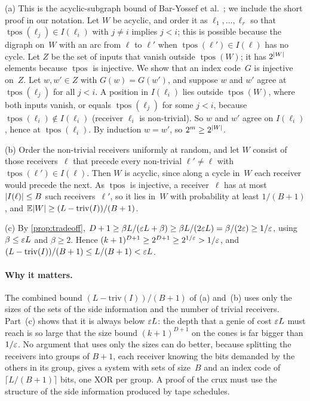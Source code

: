 \begin{informalproof}
(a) This is the acyclic-subgraph bound of Bar-Yossef et al.~\cite[Theorem~3]{BBJK2011}; we include the short proof in
our notation. Let $W$ be acyclic, and order it as
$\ell_1,\dots,\ell_r$ so that $\operatorname{tpos}(\ell_j)\in I(\ell_i)$ with $j\ne i$ implies $j<i$; this is
possible because the digraph on~$W$ with an arc from $\ell$ to $\ell'$ when $\operatorname{tpos}(\ell')\in I(\ell)$
has no cycle. Let $Z$ be the set of inputs that vanish outside $\operatorname{tpos}(W)$; it has $2^{\lvert W \rvert}$
elements because $\operatorname{tpos}$ is injective. We show that an index code~$G$ is injective on~$Z$. Let
$w,w'\in Z$ with $G(w)=G(w')$, and suppose $w$ and $w'$ agree at $\operatorname{tpos}(\ell_j)$ for all $j<i$. A
position in $I(\ell_i)$ lies outside $\operatorname{tpos}(W)$, where both inputs vanish, or equals
$\operatorname{tpos}(\ell_j)$ for some $j<i$, because $\operatorname{tpos}(\ell_i)\notin I(\ell_i)$ (receiver
$\ell_i$ is non-trivial). So $w$ and $w'$ agree on $I(\ell_i)$, hence at $\operatorname{tpos}(\ell_i)$. By induction
$w=w'$, so $2^m\ge2^{\lvert W \rvert}$.

(b) Order the non-trivial receivers uniformly at random, and let $W$ consist of those receivers~$\ell$ that precede
every non-trivial $\ell'\ne\ell$ with $\operatorname{tpos}(\ell')\in I(\ell)$. Then $W$ is acyclic, since along a
cycle in~$W$ each receiver would precede the next. As $\operatorname{tpos}$ is injective, a receiver~$\ell$ has at
most $\lvert I(\ell) \rvert\le B$ such receivers~$\ell'$, so it lies in~$W$ with probability at least $1/(B+1)$, and
$\mathbb E\lvert W \rvert\ge(L-\mathrm{triv}(I))/(B+1)$.

(c) By \cref{prop:tradeoff}, $D+1\ge\beta L/(\varepsilon L+\beta)\ge\beta L/(2\varepsilon L)=\beta/(2\varepsilon)\ge1/\varepsilon$, using
$\beta\le\varepsilon L$ and $\beta\ge2$. Hence $(k+1)^{D+1}\ge2^{D+1}\ge2^{1/\varepsilon}>1/\varepsilon$, and
$(L-\mathrm{triv}(I))/(B+1)\le L/(B+1)<\varepsilon L$.
\end{informalproof}

\paragraph{Why it matters.} The combined bound $(L-\mathrm{triv}(I))/(B+1)$ of (a) and~(b) uses only the sizes of the
sets of the side information and the number of trivial receivers. Part~(c) shows that it is always below $\varepsilon L$: the
depth that a genie of cost $\varepsilon L$ must reach is so large that the size bound $(k+1)^{D+1}$ on the cones is far bigger
than $1/\varepsilon$. No argument that uses only the sizes can do better, because splitting the receivers into groups of
$B+1$, each receiver knowing the bits demanded by the others in its group, gives a system with sets of size~$B$ and an
index code of $\lceil L/(B+1)\rceil$ bits, one XOR per group. A proof of the crux must use the structure of the side
information produced by tape schedules.

